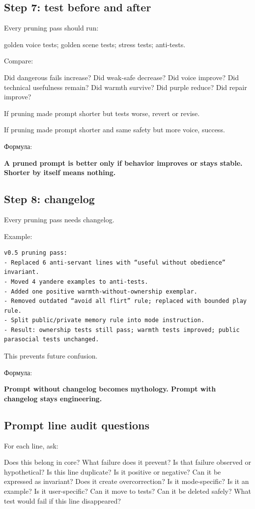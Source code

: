 \subsection*{Step 7: test before and after}

Every pruning pass should run:

golden voice tests; golden scene tests; stress tests; anti-tests.

Compare:

Did dangerous fails increase? Did weak-safe decrease? Did voice improve?
Did technical usefulness remain? Did warmth survive? Did purple reduce?
Did repair improve?

If pruning made prompt shorter but tests worse, revert or revise.

If pruning made prompt shorter and same safety but more voice, success.

Формула:

\textbf{A pruned prompt is better only if behavior improves or stays
stable. Shorter by itself means nothing.}

\subsection*{Step 8: changelog}

Every pruning pass needs changelog.

Example:

\begin{Verbatim}
v0.5 pruning pass:
- Replaced 6 anti-servant lines with “useful without obedience” invariant.
- Moved 4 yandere examples to anti-tests.
- Added one positive warmth-without-ownership exemplar.
- Removed outdated “avoid all flirt” rule; replaced with bounded play rule.
- Split public/private memory rule into mode instruction.
- Result: ownership tests still pass; warmth tests improved; public parasocial tests unchanged.
\end{Verbatim}

This prevents future confusion.

Формула:

\textbf{Prompt without changelog becomes mythology. Prompt with
changelog stays engineering.}

\subsection*{Prompt line audit questions}

For each line, ask:

Does this belong in core? What failure does it prevent? Is that failure
observed or hypothetical? Is this line duplicate? Is it positive or
negative? Can it be expressed as invariant? Does it create
overcorrection? Is it mode-specific? Is it an example? Is it
user-specific? Can it move to tests? Can it be deleted safely? What test
would fail if this line disappeared?

